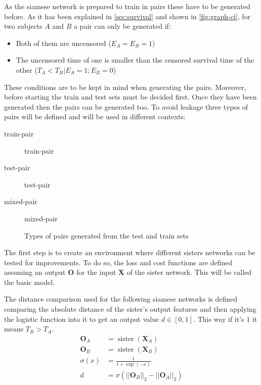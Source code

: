 
As the siamese network is prepared to train in pairs these have to be generated before. As
it has been explained in \autoref{sec:survival} and shown in \autoref{fig:graph-ci},
for two subjects \( A \) and \( B \) a pair can only be generated if:
\begin{itemize}[noitemsep, topsep=0pt]
  \item Both of them are uncensored (\( E_A = E_B = 1\))
  \item The uncensored time of one is smaller than the censored survival time of the other
  (\( T_A < T_B | E_A = 1; E_B = 0 \))
\end{itemize}

These conditions are to be kept in mind when generating the pairs. Moreover, before starting
the train and test sets must be decided first. Once they have been generated then the pairs
can be generated too. To avoid \gls{leakage} three types of pairs will be defined and will be
used in different contexts:
\begin{description}
  \item[\Gls{train-pair}] \glsdesc*{train-pair}
  \item[\Gls{test-pair}] \glsdesc*{test-pair}
  \item[\Gls{mixed-pair}] \glsdesc*{mixed-pair}
\end{description}

\begin{figure}
  \centering

  

  \caption{Types of pairs generated from the test and train sets}
\end{figure}


\label{sec:basic-siamese}

The first step is to create an environment where different sisters networks can be tested
for improvements. To do so, the loss and cost functions are defined assuming an output
\( \bm{O} \) for the input \( \bm{X} \) of the sister network. This will be called the
basic model.

The distance comparison used for the following siamese networks is defined comparing the 
absolute distance of the sister's output features and then applying the logistic function 
into it to get an output value \( d \in [0, 1] \). This way if it's 1 it means \( T_B > T_A \).
\begin{align*}
  \bm{O}_A &= \operatorname{sister}(\bm{X}_A) \\
  \bm{O}_B &= \operatorname{sister}(\bm{X}_B) \\
  \sigma(x) &= \frac{1}{1 + \exp(-x)} \\
  d &= \sigma(||\bm{O}_B||_2 - ||\bm{O}_A||_2) 
\end{align*}

